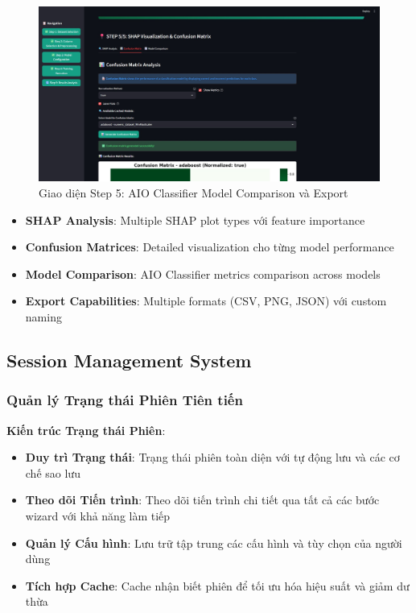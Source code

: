 \begin{figure}[H]
    \centering
\includegraphics[width=\textwidth]{UI/Step5-3.jpg}
\caption{Giao diện Step 5: AIO Classifier Model Comparison và Export}
\label{fig:wizard_step5_real_3}
\end{figure}

\begin{itemize}
    \item \textbf{SHAP Analysis}: Multiple SHAP plot types với feature importance
    \item \textbf{Confusion Matrices}: Detailed visualization cho từng model performance
    \item \textbf{Model Comparison}: AIO Classifier metrics comparison across models
    \item \textbf{Export Capabilities}: Multiple formats (CSV, PNG, JSON) với custom naming
\end{itemize}

\subsection{Session Management System}\label{subsec:session-management}

\subsubsection{Quản lý Trạng thái Phiên Tiên tiến}

\textbf{Kiến trúc Trạng thái Phiên}:
\begin{itemize}
    \item \textbf{Duy trì Trạng thái}: Trạng thái phiên toàn diện với tự động lưu và các cơ chế sao lưu
    \item \textbf{Theo dõi Tiến trình}: Theo dõi tiến trình chi tiết qua tất cả các bước wizard với khả năng làm tiếp
    \item \textbf{Quản lý Cấu hình}: Lưu trữ tập trung các cấu hình và tùy chọn của người dùng
    \item \textbf{Tích hợp Cache}: Cache nhận biết phiên để tối ưu hóa hiệu suất và giảm dư thừa
\end{itemize}

